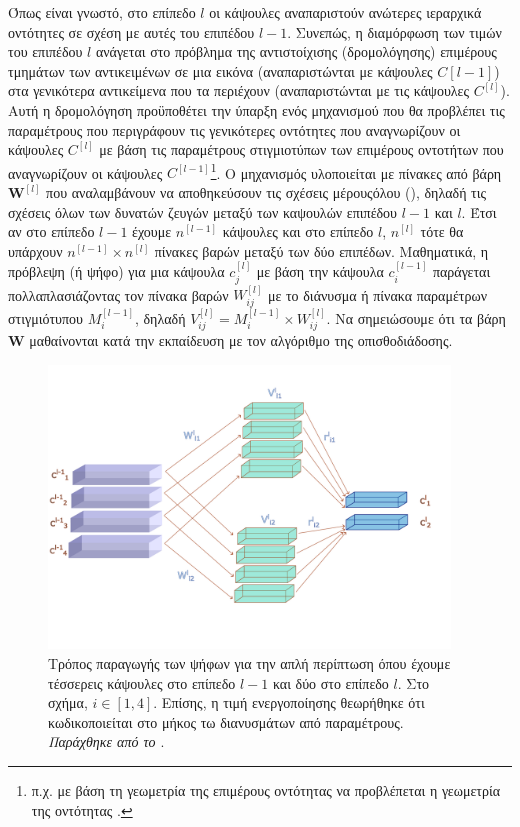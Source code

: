 Όπως είναι γνωστό, στο επίπεδο $l$ οι κάψουλες αναπαριστούν ανώτερες ιεραρχικά οντότητες σε σχέση με αυτές του επιπέδου $l-1$. Συνεπώς, η διαμόρφωση των τιμών του επιπέδου $l$ ανάγεται στο πρόβλημα της αντιστοίχισης (δρομολόγησης) επιμέρους τμημάτων των αντικειμένων σε μια εικόνα (αναπαριστώνται με κάψουλες $C{[l-1]}$) στα γενικότερα αντικείμενα που τα περιέχουν (αναπαριστώνται με τις κάψουλες $C^{[l]}$). Αυτή η δρομολόγηση προϋποθέτει την ύπαρξη ενός μηχανισμού που θα προβλέπει τις παραμέτρους που περιγράφουν τις γενικότερες οντότητες που αναγνωρίζουν οι κάψουλες $C^{[l]}$ με βάση τις παραμέτρους στιγμιοτύπων των επιμέρους οντοτήτων που αναγνωρίζουν οι κάψουλες $C^{[l-1]}$\footnote{π.χ. με βάση τη γεωμετρία της επιμέρους οντότητας  να προβλέπεται η γεωμετρία της οντότητας .}. O μηχανισμός υλοποιείται με πίνακες από βάρη $\boldsymbol{W}^{[l]}$ που αναλαμβάνουν να αποθηκεύσουν τις σχέσεις μέρους\textendash όλου (), δηλαδή τις σχέσεις όλων των δυνατών ζευγών μεταξύ των καψουλών επιπέδου $l-1$ και $l$. Έτσι αν στο επίπεδο $l-1$ έχουμε $n^{[l-1]}$ κάψουλες και στο επίπεδο $l$, $n^{[l]}$ τότε θα υπάρχουν $n^{[l-1]} \times n^{[l]}$ πίνακες βαρών μεταξύ των δύο επιπέδων. Μαθηματικά, η πρόβλεψη (ή ψήφο) για μια κάψουλα $c_j^{[l]}$ με βάση την κάψουλα $c_i^{[l-1]}$ παράγεται πολλαπλασιάζοντας τον πίνακα βαρών $W^{[l]}_{ij}$ με το διάνυσμα ή πίνακα παραμέτρων στιγμιότυπου $M_i^{[l-1]}$, δηλαδή $V^{[l]}_{ij} = M_i^{[l-1]}\times W^{[l]}_{ij}$. Να σημειώσουμε ότι τα βάρη $\boldsymbol{W}$ μαθαίνονται κατά την εκπαίδευση με τον αλγόριθμο της οπισθοδιάδοσης. \par

\begin{figure}[h]
  \centering
  \includegraphics[width=0.95\textwidth]{images/chapter theoritical background/capsule_voting.pdf}
  \caption{Τρόπος παραγωγής των ψήφων για την απλή περίπτωση όπου έχουμε τέσσερεις κάψουλες στο επίπεδο $l-1$ και δύο στο επίπεδο $l$. Στο σχήμα, $i \in [1,4]$. Επίσης, η τιμή ενεργοποίησης θεωρήθηκε ότι κωδικοποιείται στο μήκος τω διανυσμάτων από παραμέτρους. \textit{Παράχθηκε από το \href{https://inkscape.org/}{}}.}
  \label{fig:capsule_cast_votes}
\end{figure}

